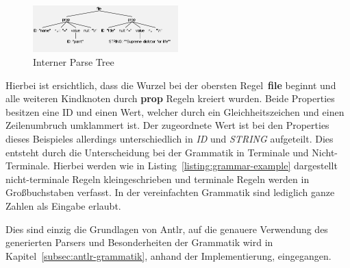 \begin{figure}[h]
    \centering
    \includegraphics[width=0.5\textwidth]{images/2.2/parseTreeExample}
    \caption{Interner Parse Tree}
    \label{fig:parse-example}
\end{figure}

Hierbei ist ersichtlich, dass die Wurzel bei der obersten Regel~\textbf{file} beginnt und alle weiteren Kindknoten durch \textbf{prop} Regeln kreiert wurden.
Beide Properties besitzen eine ID und einen Wert, welcher durch ein Gleichheitszeichen und einen Zeilenumbruch umklammert ist.
Der zugeordnete Wert ist bei den Properties dieses Beispieles allerdings unterschiedlich in \textit{ID} und \textit{STRING} aufgeteilt.
Dies entsteht durch die Unterscheidung bei der Grammatik in Terminale und Nicht-Terminale.
Hierbei werden wie in Listing~\ref{listing:grammar-example} dargestellt nicht-terminale Regeln kleingeschrieben und terminale Regeln werden in Großbuchstaben verfasst.
In der vereinfachten Grammatik sind lediglich ganze Zahlen als Eingabe erlaubt.

Dies sind einzig die Grundlagen von Antlr, auf die genauere Verwendung des generierten Parsers und Besonderheiten der Grammatik wird in Kapitel~\ref{subsec:antlr-grammatik},
anhand der Implementierung, eingegangen.
